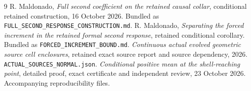\documentclass[11pt]{article}
\begin{document}
\begin{thebibliography}{9}\small
{} R. Maldonado, \emph{Full second coefficient on the
retained causal collar}, conditional retained construction, 16 October 2026.
Bundled as \texttt{FULL\_SECOND\_RESPONSE\_CONSTRUCTION.md}.
 R. Maldonado, \emph{Separating the forced increment in the
retained formal second response}, retained conditional corollary.
Bundled as \texttt{FORCED\_INCREMENT\_BOUND.md}.
 \emph{Continuous actual evolved geometric source cell
enclosures}, retained exact source report and source dependency, 2026.
\texttt{ACTUAL\_SOURCES\_NORMAL.json}.
 \emph{Conditional positive mean at the shell-reaching
point}, detailed proof, exact certificate and independent review,
23 October 2026. Accompanying reproducibility files.
\end{thebibliography}
\end{document}
